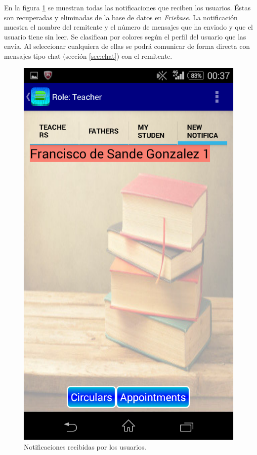 		En la figura \ref{fig:notifications} se muestran todas las notificaciones que reciben los usuarios. Éstas son recuperadas y eliminadas de la base de datos en {\it Friebase}. La notificación muestra el nombre del remitente y el número de mensajes que ha enviado y que el usuario tiene sin leer. Se clasifican por colores según el perfil del usuario que las envía.
		Al seleccionar cualquiera de ellas se podrá comunicar de forma directa con mensajes tipo chat (sección \ref{sec:chat}) con el remitente.
	
		\begin{figure}[h !]
			\centering
			\includegraphics[scale=0.3]{Imagenes/App/Notifications}
			\caption{Notificaciones recibidas por los usuarios.}
			\label{fig:notifications}
		\end{figure}
	
